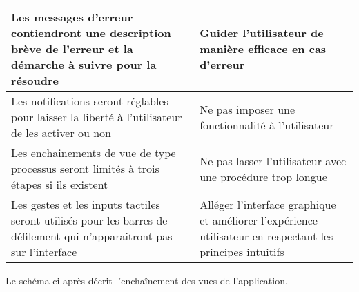 \begin{table}[H]
\begin{tabular}{p{8cm}|p{8cm}}
        Les messages d'erreur contiendront une description brève de l'erreur et la démarche à suivre pour la résoudre & Guider l'utilisateur de manière efficace en cas d'erreur \\ \hline
        Les notifications seront réglables pour laisser la liberté à l'utilisateur de les activer ou non & Ne pas imposer une fonctionnalité à l'utilisateur \\ \hline
        Les enchainements de vue de type processus seront limités à trois étapes si ils existent & Ne pas lasser l'utilisateur avec une procédure trop longue \\ \hline
        Les gestes et les inputs tactiles seront utilisés pour les barres de défilement qui n'apparaitront pas sur l'interface & Alléger l'interface graphique et améliorer l'expérience utilisateur en respectant les principes intuitifs \\
    \end{tabular}
\end{table}

    Le schéma ci-après décrit l'enchaînement des vues de l'application.
    
